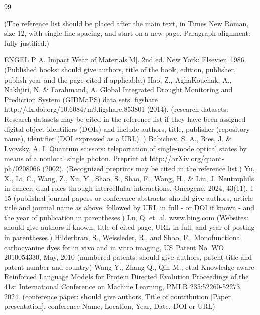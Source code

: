 \newcommand{\refnote}{%
  \item[] {(The reference list should be placed after the main text, in Times New Roman, size 12, with single line spacing, and start on a new page. Paragraph alignment: fully justified.)}
}

\clearpage

\renewcommand{\bibname}{\xiaoyi\bf\vspace{5pt} References}

\begin{thebibliography}{99}
    \setlength{\itemindent}{-5pt}
    \refnote
    
     ENGEL P A.  Impact Wear of Materials[M]. 2nd ed. New York: Elsevier, 1986. (Published books: should give authors, title of the book, edition, publisher, publish year and the page cited if applicable.)
    	Hao, Z., AghaKouchak, A., Nakhjiri, N. \& Farahmand, A. Global Integrated Drought Monitoring and Prediction System (GIDMaPS) data sets. figshare http://dx.doi.org/10.6084/m9.figshare.853801 (2014). (research datasets: Research datasets may be cited in the reference list if they have been assigned digital object identifiers (DOIs) and include authors, title, publisher (repository name), identifier (DOI expressed as a URL). )
    	Babichev, S. A., Ries, J. \& Lvovsky, A. I. Quantum scissors: teleportation of single-mode optical states by means of a nonlocal single photon. Preprint at http://arXiv.org/quant-ph/0208066 (2002). (Recognized preprints may be cited in the reference list.)
    	Yu, X., Li, C., Wang, Z., Xu, Y., Shao, S., Shao, F., Wang, H., \& Liu, J. Neutrophils in cancer: dual roles through intercellular interactions. Oncogene, 2024, 43(11), 1-15 (published journal papers or conference abstracts: should give authors, article title and journal name as above, followed by URL in full - or DOI if known - and the year of publication in parentheses.)
    	Lu, Q. et. al. www.bing.com (Websites: should give authors if known, title of cited page, URL in full, and year of posting in parentheses.)
    	Hilderbran, S., Weissleder, R., and Shao, F., Monofunctional carbocyanine dyes for in vivo and in vitro imaging, US Patent No. WO 2010054330, May, 2010 (numbered patents: should give authors, patent title and patent number and country)
     Wang Y., Zhang Q., Qin M., et.al Knowledge-aware Reinforced Language Models for Protein Directed Evolution Proceedings of the 41st International Conference on Machine Learning, PMLR 235:52260-52273, 2024. (conference paper: should give authors, Title of contribution [Paper presentation]. conference Name, Location, Year, Date. DOI or URL)
\end{thebibliography}
\doublespacing